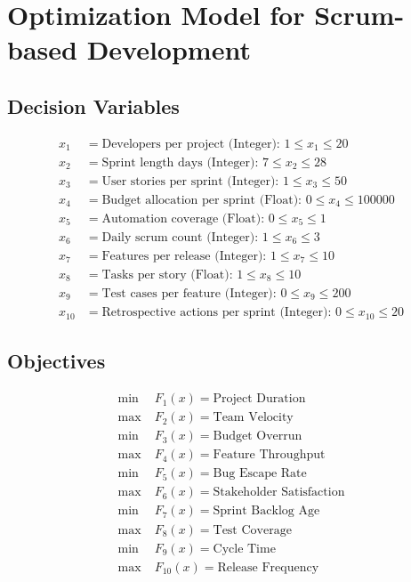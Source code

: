 \documentclass{article}
\begin{document}
\section*{Optimization Model for Scrum-based Development}

\subsection*{Decision Variables}
\begin{align*}
x_1 &= \text{Developers per project (Integer): }1 \le x_1 \le 20\\
x_2 &= \text{Sprint length days (Integer): }7 \le x_2 \le 28\\
x_3 &= \text{User stories per sprint (Integer): }1 \le x_3 \le 50\\
x_4 &= \text{Budget allocation per sprint (Float): }0 \le x_4 \le 100000\\
x_5 &= \text{Automation coverage (Float): }0 \le x_5 \le 1\\
x_6 &= \text{Daily scrum count (Integer): }1 \le x_6 \le 3\\
x_7 &= \text{Features per release (Integer): }1 \le x_7 \le 10\\
x_8 &= \text{Tasks per story (Float): }1 \le x_8 \le 10\\
x_9 &= \text{Test cases per feature (Integer): }0 \le x_9 \le 200\\
x_{10} &= \text{Retrospective actions per sprint (Integer): }0 \le x_{10} \le 20
\end{align*}

\subsection*{Objectives}
\begin{align*}
\min\; &F_1(x) = \text{Project Duration}\\
\max\; &F_2(x) = \text{Team Velocity}\\
\min\; &F_3(x) = \text{Budget Overrun}\\
\max\; &F_4(x) = \text{Feature Throughput}\\
\min\; &F_5(x) = \text{Bug Escape Rate}\\
\max\; &F_6(x) = \text{Stakeholder Satisfaction}\\
\min\; &F_7(x) = \text{Sprint Backlog Age}\\
\max\; &F_8(x) = \text{Test Coverage}\\
\min\; &F_9(x) = \text{Cycle Time}\\
\max\; &F_{10}(x) = \text{Release Frequency}
\end{align*}
\end{document}
